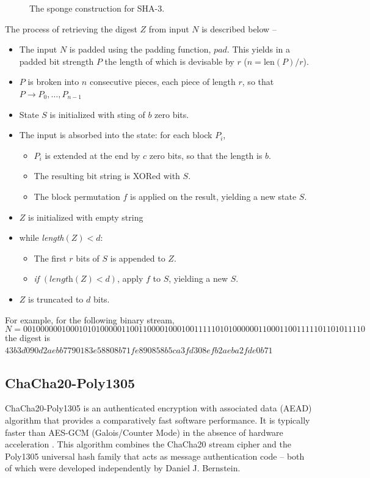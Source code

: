 \documentclass[a4paper]{cas-sc}
\begin{document}
\begin{figure}[pos=h]
    \centering
    
    \caption{The sponge construction for SHA-3.}
    \label{fig:sponge}
\end{figure}

The process of retrieving the digest $Z$ from input $N$ is described below --
\begin{itemize}
    \item The input $N$ is padded using the padding function, $pad$. This yields in a padded bit strength $P$ the length of which is devisable by $r$ ($n=\text{len}(P)/r$).
    \item $P$ is broken into $n$ consecutive pieces, each piece of length $r$, so that $P \to P_{0},\ldots,P_{n-1}$
    \item State $S$ is initialized with sting of $b$ zero bits.
    \item The input is absorbed into the state: for each block $P_{i}$, \begin{itemize}
              \item $P_{i}$ is extended at the end by $c$ zero bits, so that the length is $b$.
              \item The resulting bit string is XORed with $S$.
              \item The block permutation $f$ is applied on the result, yielding a new state $S$.
          \end{itemize}
    \item $Z$ is initialized with empty string
    \item while \textit{length}$(Z)<d$:\begin{itemize}
              \item The first $r$ bits of $S$ is appended to $Z$.
              \item \textit{if} $(\textit{length}(Z)<d)$, apply $f$ to $S$, yielding a new $S$.
          \end{itemize}
    \item $Z$ is truncated to $d$ bits.
\end{itemize}

For example, for the following binary stream, \[N=00100000010001010100000110011000010001001111101010000001100011001111101101011110\]
the digest is $43b3d090d2aebb7790183e58808b71fe890858b5ca3fd308efb2aeba2fde0b71$
\subsection{ChaCha20-Poly1305}
\label{sec:chacha20}
ChaCha20-Poly1305 is an authenticated encryption with associated data (AEAD) algorithm that provides a comparatively fast software performance. It is typically faster than AES-GCM (Galois/Counter Mode) in the absence of hardware acceleration \cite{rfc7539}. This algorithm combines the ChaCha20 stream cipher \cite{bernstein2008chacha} and the Poly1305 \cite{bernstein2005poly1305} universal hash family that acts as message authentication code -- both of which were developed independently by Daniel J. Bernstein.
\end{document}
